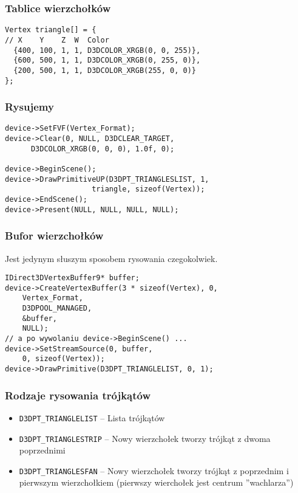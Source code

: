 \documentclass{beamer}
\begin{document}
\begin{frame}[fragile]
\frametitle{Tablice wierzchołków}

\begin{lstlisting}
Vertex triangle[] = {
// X    Y    Z  W  Color
  {400, 100, 1, 1, D3DCOLOR_XRGB(0, 0, 255)},
  {600, 500, 1, 1, D3DCOLOR_XRGB(0, 255, 0)},
  {200, 500, 1, 1, D3DCOLOR_XRGB(255, 0, 0)}
};
\end{lstlisting}

\end{frame}

\begin{frame}[fragile]
\frametitle{Rysujemy}

\begin{lstlisting}
device->SetFVF(Vertex_Format);
device->Clear(0, NULL, D3DCLEAR_TARGET,
      D3DCOLOR_XRGB(0, 0, 0), 1.0f, 0);

device->BeginScene();
device->DrawPrimitiveUP(D3DPT_TRIANGLESLIST, 1,
                    triangle, sizeof(Vertex));
device->EndScene();
device->Present(NULL, NULL, NULL, NULL);
\end{lstlisting}

\end{frame}

\begin{frame}[fragile]
\frametitle{Bufor wierzchołków}

Jest jedynym słuszym sposobem rysowania czegokolwiek.

\begin{lstlisting}
IDirect3DVertexBuffer9* buffer;
device->CreateVertexBuffer(3 * sizeof(Vertex), 0,
    Vertex_Format,
    D3DPOOL_MANAGED,
    &buffer,
    NULL);
// a po wywolaniu device->BeginScene() ...
device->SetStreamSource(0, buffer,
    0, sizeof(Vertex));
device->DrawPrimitive(D3DPT_TRIANGLELIST, 0, 1);
\end{lstlisting}

\end{frame}

\begin{frame}
\frametitle{Rodzaje rysowania trójkątów}

\begin{itemize}
  \item \texttt{D3DPT\_TRIANGLELIST} -- Lista trójkątów
  \item \texttt{D3DPT\_TRIANGLESTRIP} -- Nowy wierzchołek tworzy trójkąt z dwoma poprzednimi
  \item \texttt{D3DPT\_TRIANGLESFAN} -- Nowy wierzchołek tworzy trójkąt z poprzednim i pierwszym wierzchołkiem (pierwszy wierchołek jest centrum ''wachlarza'')
\end{itemize}

\end{frame}
\end{document}
